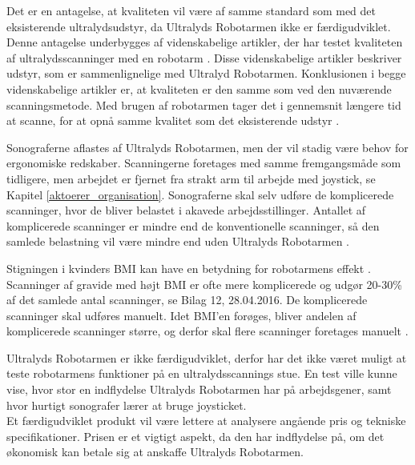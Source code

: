 Det er en antagelse, at kvaliteten vil være af samme standard som med det eksisterende ultralydsudstyr, da Ultralyds Robotarmen ikke er færdigudviklet. Denne antagelse underbygges af videnskabelige artikler, der har testet kvaliteten af ultralydsscanninger med en robotarm \cite{8}\cite{18}\cite{Hjerterobot}. Disse videnskabelige artikler beskriver udstyr, som er sammenlignelige med Ultralyd Robotarmen. Konklusionen i begge videnskabelige artikler er, at kvaliteten er den samme som ved den nuværende scanningsmetode. Med brugen af robotarmen tager det i gennemsnit længere tid at scanne, for at opnå samme kvalitet som det eksisterende udstyr \cite{18}. 

Sonograferne aflastes af Ultralyds Robotarmen, men der vil stadig være behov for ergonomiske redskaber. Scanningerne foretages med samme fremgangsmåde som tidligere, men arbejdet er fjernet fra strakt arm til arbejde med joystick, se Kapitel \ref{aktoerer_organisation}. Sonograferne skal selv udføre de komplicerede scanninger, hvor de bliver belastet i akavede arbejdsstillinger. Antallet af komplicerede scanninger er mindre end de konventionelle scanninger, så den samlede belastning vil være mindre end uden Ultralyds Robotarmen \cite{24}. 

Stigningen i kvinders BMI kan have en betydning for robotarmens effekt \cite{kvinderovervaegt}. Scanninger af gravide med højt BMI er ofte mere komplicerede og udgør 20-30\% af det samlede antal scanninger, se Bilag 12, 28.04.2016. De komplicerede scanninger skal udføres manuelt. Idet BMI’en forøges, bliver andelen af komplicerede scanninger større, og derfor skal flere scanninger foretages manuelt \cite{24}\cite{31}\cite{8}. 

Ultralyds Robotarmen er ikke færdigudviklet, derfor har det ikke været muligt at teste robotarmens funktioner på en ultralydsscannings stue. En test ville kunne vise, hvor stor en indflydelse Ultralyds Robotarmen har på arbejdsgener, samt hvor hurtigt sonografer lærer at bruge joysticket. \\ 
Et færdigudviklet produkt vil være lettere at analysere angående pris og tekniske specifikationer. Prisen er et vigtigt aspekt, da den har indflydelse på, om det økonomisk kan betale sig at anskaffe Ultralyds Robotarmen. 